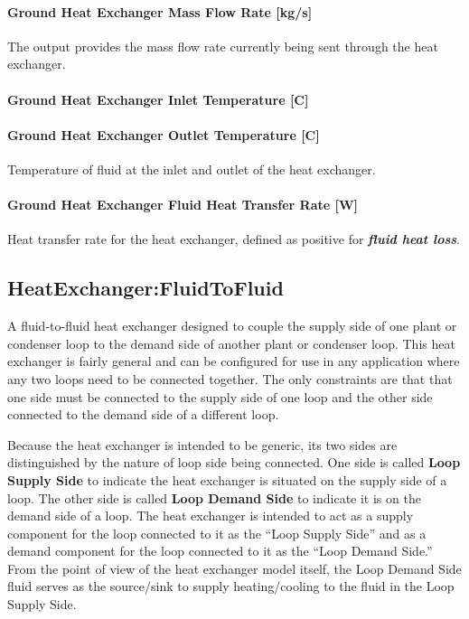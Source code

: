 \paragraph{Ground Heat Exchanger Mass Flow Rate {[}kg/s{]}}\label{ground-heat-exchanger-mass-flow-rate-kgs-3}

The output provides the mass flow rate currently being sent through the heat exchanger.

\paragraph{Ground Heat Exchanger Inlet Temperature {[}C{]}}\label{ground-heat-exchanger-inlet-temperature-c-3}

\paragraph{Ground Heat Exchanger Outlet Temperature {[}C{]}}\label{ground-heat-exchanger-outlet-temperature-c-3}

Temperature of fluid at the inlet and outlet of the heat exchanger.

\paragraph{Ground Heat Exchanger Fluid Heat Transfer Rate {[}W{]}}\label{ground-heat-exchanger-fluid-heat-transfer-rate-w}

Heat transfer rate for the heat exchanger, defined as positive for \textbf{\emph{fluid heat loss}}.

\subsection{HeatExchanger:FluidToFluid}\label{heatexchangerfluidtofluid}

A fluid-to-fluid heat exchanger designed to couple the supply side of one plant or condenser loop to the demand side of another plant or condenser loop.
This heat exchanger is fairly general and can be configured for use in any application where any two loops need to be connected together.
The only constraints are that that one side must be connected to the supply side of one loop and the other side connected to the demand side of a different loop.

Because the heat exchanger is intended to be generic, its two sides are distinguished by the nature of loop side being connected.
One side is called \textbf{Loop Supply Side} to indicate the heat exchanger is situated on the supply side of a loop.
The other side is called \textbf{Loop Demand Side} to indicate it is on the demand side of a loop.
The heat exchanger is intended to act as a supply component for the loop connected to it as the ``Loop Supply Side''
and as a demand component for the loop connected to it as the ``Loop Demand Side.''
From the point of view of the heat exchanger model itself, the Loop Demand Side fluid serves as the source/sink to supply heating/cooling to the fluid in the Loop Supply Side.

